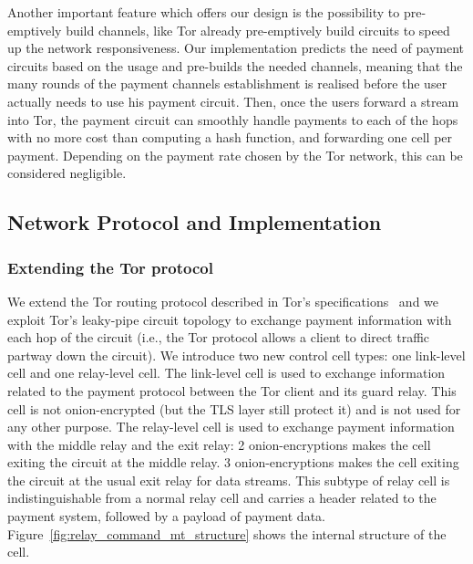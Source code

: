 Another important feature which offers our design is the possibility to pre-emptively build channels, like Tor already pre-emptively build circuits to speed up the network responsiveness. Our implementation predicts the need of payment circuits based on the usage and pre-builds the needed channels, meaning that the many rounds of the payment channels establishment is realised before the user actually needs to use his payment circuit. Then, once the users forward a stream into Tor, the payment circuit can smoothly handle payments to each of the hops with no more cost than computing a hash function, and forwarding one cell per payment. Depending on the payment rate chosen by the Tor network, this can be considered negligible.
\subsection{Network Protocol and Implementation}

\subsubsection{Extending the Tor protocol}
We extend the Tor routing protocol described in Tor's specifications~\cite{torspec} and we exploit Tor's leaky-pipe circuit topology to exchange payment information with each hop of the circuit (i.e., the Tor protocol allows a client to direct traffic partway down the circuit). We introduce two new control cell types: one link-level cell and one relay-level cell. The link-level cell is used to exchange information related to the payment protocol between the Tor client and its guard relay. This cell is not onion-encrypted (but the TLS layer still protect it) and is not used for any other purpose. The relay-level cell is used to exchange payment information with the middle relay and the exit relay: 2 onion-encryptions makes the cell exiting the circuit at the middle relay. 3 onion-encryptions makes the cell exiting the circuit at the usual exit relay for data streams. This subtype of relay cell is indistinguishable from a normal relay cell and carries a header related to the payment system, followed by a payload of payment data. Figure~\ref{fig:relay_command_mt_structure} shows the internal structure of the cell.

